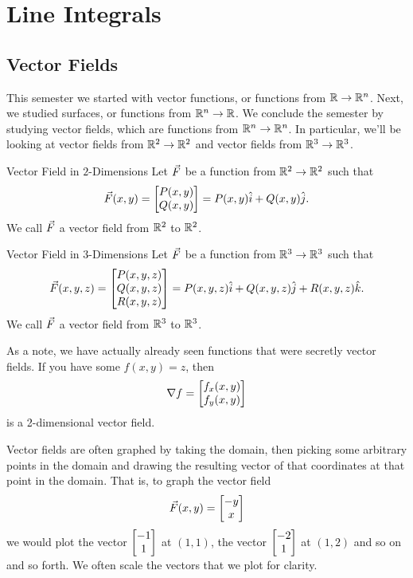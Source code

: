 \section{Line Integrals}
\subsection{Vector Fields}
This semester we started with vector functions, or functions from $\mathbb{R}\to\mathbb{R}^n$. Next, we studied surfaces, or functions from $\mathbb{R}^n\to\mathbb{R}$. We conclude the semester by studying vector fields, which are functions from $\mathbb{R}^n\to\mathbb{R}^n$. In particular, we'll be looking at vector fields from $\mathbb{R}^2\to\mathbb{R}^2$ and vector fields from $\mathbb{R}^3\to\mathbb{R}^3$.

\begin{definition}{Vector Field in $2$-Dimensions}
Let $\vec{F}$ be a function from $\mathbb{R}^2\to\mathbb{R}^2$ such that $$\vec{F}(x,y)=\begin{bmatrix}P(x,y)\\Q(x,y)\end{bmatrix}=P(x,y)\hat{i}+Q(x,y)\hat{j}.$$
We call $\vec{F}$ a vector field from $\mathbb{R}^2$ to $\mathbb{R}^2$.
\end{definition}

\begin{definition}{Vector Field in $3$-Dimensions}
Let $\vec{F}$ be a function from $\mathbb{R}^3\to\mathbb{R}^3$ such that $$\vec{F}(x,y,z)=\begin{bmatrix}P(x,y,z)\\Q(x,y,z)\\R(x,y,z)\end{bmatrix}=P(x,y,z)\hat{i}+Q(x,y,z)\hat{j}+R(x,y,z)\hat{k}.$$
We call $\vec{F}$ a vector field from $\mathbb{R}^3$ to $\mathbb{R}^3$.
\end{definition}

As a note, we have actually already seen functions that were secretly vector fields. If you have some $f(x,y)=z$, then $$\nabla f=\begin{bmatrix}f_x(x,y)\\f_y(x,y)\end{bmatrix} $$ is a 2-dimensional vector field.

Vector fields are often graphed by taking the domain, then picking some arbitrary points in the domain and drawing the resulting vector of that coordinates at that point in the domain. That is, to graph the vector field $$\vec{F}(x,y)=\begin{bmatrix}-y\\x\end{bmatrix} $$ we would plot the vector $\begin{bmatrix}-1\\1\end{bmatrix}$ at $(1,1)$, the vector $\begin{bmatrix}-2\\1\end{bmatrix}$ at $(1,2)$ and so on and so forth. We often scale the vectors that we plot for clarity.

